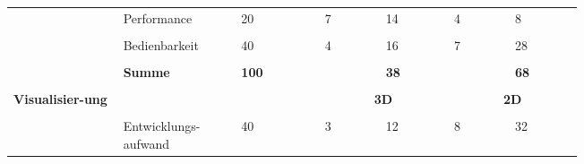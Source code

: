 \documentclass[main.tex]{subfiles} %
\begin{document}
\begin{table}[H]
\begin{tabular}{|p{0.14\linewidth}|p{0.15\linewidth}|p{0.115\linewidth}|p{0.08\linewidth}|p{0.09\linewidth}|p{0.08\linewidth}|p{0.09\linewidth}|}
                                                           & Performance                         & 20                                           & 7                                              & 14          & 4          & 8           \\[1pt]
        \cline{2-7}
                                                           &                                     &                                              &                                                &             &            &             \\[-9pt]
                                                           & Bedienbarkeit                       & 40                                           & 4                                              & 16          & 7          & 28          \\[1pt]
        \cline{2-7}
                                                           &                                     &                                              &                                                &             &            &             \\[-9pt]
                                                           & \textbf{Summe}                      & \textbf{100}                                 &                                                & \textbf{38} &            & \textbf{68} \\[1pt]
        \hline
        \hline
                                                           & \multicolumn{2}{c|}{}               & \multicolumn{2}{c|}{}                        & \multicolumn{2}{c|}{}                                                                   \\[-9pt]
        \multirow{6}{4em}{\textbf{Visualisier-ung}}        & \multicolumn{2}{c|}{}               & \multicolumn{2}{c|}{\textbf{3D}}             & \multicolumn{2}{c|}{\textbf{2D}}                                                        \\[1pt]
        \cline{2-7}
                                                           &                                     &                                              &                                                &             &            &             \\[-9pt]
                                                           & Entwicklungs-aufwand                & 40                                           & 3                                              & 12          & 8          & 32          \\[1pt]

\end{tabular}
\end{table}
\end{document}
